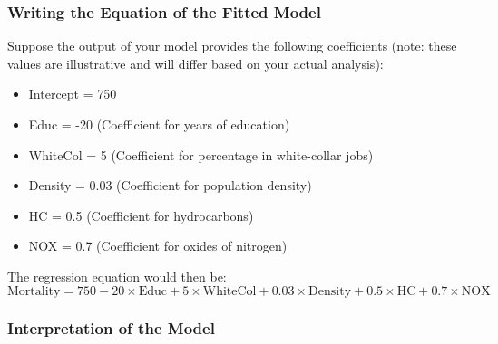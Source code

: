\documentclass[
]{article}
\providecommand{\tightlist}{%
  \setlength{\itemsep}{0pt}\setlength{\parskip}{0pt}}
\begin{document}
\hypertarget{writing-the-equation-of-the-fitted-model}{%
\subsubsection{Writing the Equation of the Fitted
Model}\label{writing-the-equation-of-the-fitted-model}}

Suppose the output of your model provides the following coefficients
(note: these values are illustrative and will differ based on your
actual analysis):

\begin{itemize}
\tightlist
\item
  Intercept = 750
\item
  Educ = -20 (Coefficient for years of education)
\item
  WhiteCol = 5 (Coefficient for percentage in white-collar jobs)
\item
  Density = 0.03 (Coefficient for population density)
\item
  HC = 0.5 (Coefficient for hydrocarbons)
\item
  NOX = 0.7 (Coefficient for oxides of nitrogen)
\end{itemize}

The regression equation would then be:
\[ \text{Mortality} = 750 - 20 \times \text{Educ} + 5 \times \text{WhiteCol} + 0.03 \times \text{Density} + 0.5 \times \text{HC} + 0.7 \times \text{NOX} \]

\hypertarget{interpretation-of-the-model}{%
\subsubsection{Interpretation of the
Model}\label{interpretation-of-the-model}}
\end{document}
